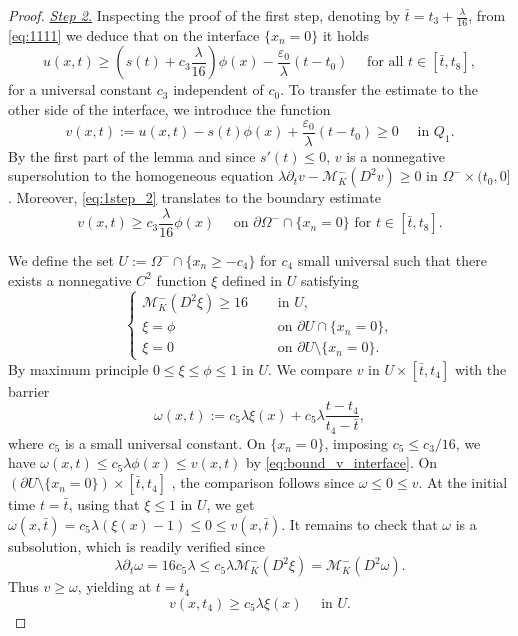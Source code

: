\documentclass[12pt]{article}
\numberwithin{Theorem}{section}
\theoremstyle{definition}
\theoremstyle{remark}
\numberwithin{equation}{section}
\newcommand{\p}{\partial}
\newcommand{\eps}{\varepsilon}
\begin{document}
\begin{proof}
\underline{\textit{Step 2.}}
Inspecting the proof of the first step, denoting by $\bar t= t_3 + \frac{\lambda}{16}$, from \eqref{eq:1111} we deduce that on the interface $\{x_n = 0\}$ it holds 
\begin{equation} \label{eq:1step_2}
    u(x,t) \geq \left( s(t) + c_3 \frac{\lambda}{16} \right) \phi(x) -\frac{\eps_0}{\lambda}(t-t_0)\quad \text{ for all } t \in \left[ \bar t, t_8\right],
\end{equation}
for a universal constant $c_3$ independent of $c_0$.
To transfer the estimate to the other side of the interface, we introduce the function
\[
v(x,t) := u(x,t) - s(t)\phi(x) + \frac{\eps_0}{\lambda}(t-t_0) \geq 0 \quad \text{ in } Q_1.
\]
By the first part of the lemma and since $s'(t) \leq 0$, $v$ is a nonnegative supersolution to the homogeneous equation $\lambda \p_t v - \mathcal M_K^- (D^2 v) \geq 0$ in $\Omega^- \times (t_0, 0]$. Moreover, \eqref{eq:1step_2} translates to the boundary estimate
\begin{equation} \label{eq:bound_v_interface}
    v(x,t) \geq c_3 \frac{\lambda}{16} \phi(x) \quad \text{ on } \p \Omega^- \cap \{ x_n = 0\} \text{ for } t \in [\bar t, t_8].
\end{equation}

We define the set $U:= \Omega^- \cap \{ x_n \geq -c_4\}$ for $c_4$ small universal such that there exists a nonnegative $C^2$ function $\xi$ defined in $U$ satisfying 
\begin{equation}
    \begin{cases}
        \mathcal M_K^- (D^2 \xi) \geq 16 \quad &\text{ in }U, \\
        \xi = \phi \quad &\text{ on } \p U \cap \{x_n=0\},  \\
        \xi= 0 \quad &\text{ on } \p U \setminus \{x_n=0\}.
    \end{cases}
\end{equation}
By maximum principle $0 \leq \xi \leq \phi \leq 1$ in $U$. We compare $v$ in $U \times [\bar t,t_4]$ with the barrier
\[
\omega(x,t):= c_5 \lambda \xi(x) + c_5 \lambda \frac{t-t_4}{t_4 - \bar t},
\]
where $c_5$ is a small universal constant. On $\{ x_n=0\}$, imposing $c_5 \leq c_3/16$, we have $\omega(x,t) \leq c_5 \lambda \phi(x) \leq v(x,t)$ by \eqref{eq:bound_v_interface}.
On $\left(\p U \setminus \{x_n=0\}\right) \times [\bar t,t_4]$ , the comparison follows since $\omega \leq 0 \leq v$. At the initial time $t=\bar t$, using that $\xi \leq 1$ in $U$, we get $\omega(x,\bar t) = c_5 \lambda (\xi(x)-1) \leq 0 \leq v(x,\bar t)$.
It remains to check that $\omega$ is a subsolution, which is readily verified since 
$$\lambda \p_t \omega = 16 c_5 \lambda \leq c_5 \lambda \mathcal M_K^- (D^2 \xi) = \mathcal M_K^- (D^2 \omega).
$$
Thus $v \geq \omega$, yielding at $t=t_4$
\[
v(x,t_4) \geq  c_5 \lambda \xi(x) \quad \text{ in } U.
\]




\end{proof}
\end{document}
